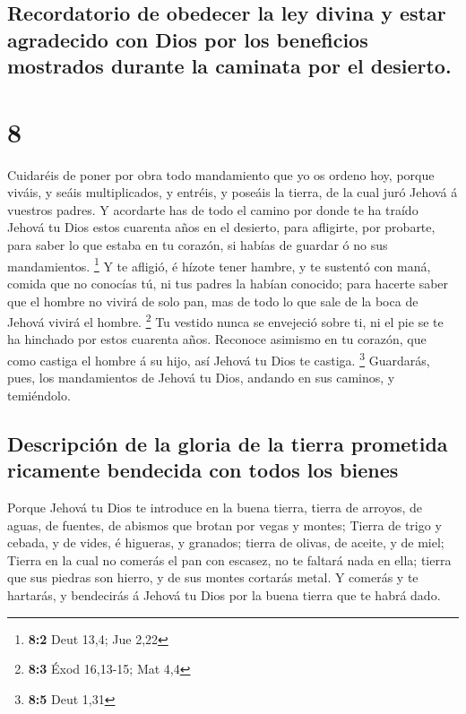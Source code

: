 \hypertarget{recordatorio-de-obedecer-la-ley-divina-y-estar-agradecido-con-dios-por-los-beneficios-mostrados-durante-la-caminata-por-el-desierto.}{%
\subsection{Recordatorio de obedecer la ley divina y estar agradecido
con Dios por los beneficios mostrados durante la caminata por el
desierto.}\label{recordatorio-de-obedecer-la-ley-divina-y-estar-agradecido-con-dios-por-los-beneficios-mostrados-durante-la-caminata-por-el-desierto.}}

\hypertarget{section-7}{%
\section{8}\label{section-7}}

 Cuidaréis de poner por obra todo mandamiento que yo os
ordeno hoy, porque viváis, y seáis multiplicados, y entréis, y poseáis
la tierra, de la cual juró Jehová á vuestros padres.  Y
acordarte has de todo el camino por donde te ha traído Jehová tu Dios
estos cuarenta años en el desierto, para afligirte, por probarte, para
saber lo que estaba en tu corazón, si habías de guardar ó no sus
mandamientos. \footnote{\textbf{8:2} Deut 13,4; Jue 2,22}  Y
te afligió, é hízote tener hambre, y te sustentó con maná, comida que no
conocías tú, ni tus padres la habían conocido; para hacerte saber que el
hombre no vivirá de solo pan, mas de todo lo que sale de la boca de
Jehová vivirá el hombre. \footnote{\textbf{8:3} Éxod 16,13-15; Mat 4,4}
 Tu vestido nunca se envejeció sobre ti, ni el pie se te ha
hinchado por estos cuarenta años.  Reconoce asimismo en tu
corazón, que como castiga el hombre á su hijo, así Jehová tu Dios te
castiga. \footnote{\textbf{8:5} Deut 1,31}  Guardarás, pues,
los mandamientos de Jehová tu Dios, andando en sus caminos, y
temiéndolo.

\hypertarget{descripciuxf3n-de-la-gloria-de-la-tierra-prometida-ricamente-bendecida-con-todos-los-bienes}{%
\subsection{Descripción de la gloria de la tierra prometida ricamente
bendecida con todos los
bienes}\label{descripciuxf3n-de-la-gloria-de-la-tierra-prometida-ricamente-bendecida-con-todos-los-bienes}}

 Porque Jehová tu Dios te introduce en la buena tierra,
tierra de arroyos, de aguas, de fuentes, de abismos que brotan por vegas
y montes;  Tierra de trigo y cebada, y de vides, é higueras,
y granados; tierra de olivas, de aceite, y de miel;  Tierra
en la cual no comerás el pan con escasez, no te faltará nada en ella;
tierra que sus piedras son hierro, y de sus montes cortarás metal.
 Y comerás y te hartarás, y bendecirás á Jehová tu Dios por
la buena tierra que te habrá dado.

